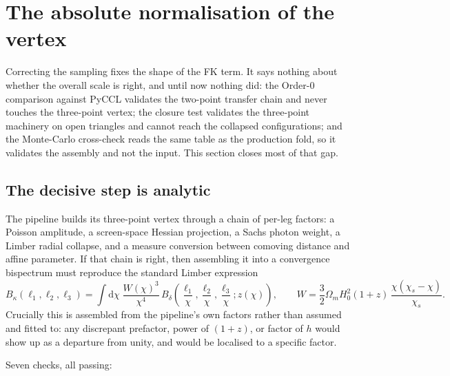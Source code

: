 \section{The absolute normalisation of the vertex}
\label{sec:normalisation}

Correcting the sampling fixes the shape of the FK term. It says nothing
about whether the overall scale is right, and until now nothing did: the
Order-0 comparison against PyCCL validates the two-point transfer chain and
never touches the three-point vertex; the  closure test
validates the three-point machinery on open triangles and cannot reach the
collapsed configurations; and the Monte-Carlo cross-check reads the same
table as the production fold, so it validates the assembly and not the
input. This section closes most of that gap.

\subsection{The decisive step is analytic}

The pipeline builds its three-point vertex through a chain of per-leg
factors: a Poisson amplitude, a screen-space Hessian projection, a Sachs
photon weight, a Limber radial collapse, and a measure conversion between
comoving distance and affine parameter. If that chain is right, then
assembling it into a convergence bispectrum must reproduce the standard
Limber expression
\[
  B_\kappa(\ell_1,\ell_2,\ell_3) = \int\!\mathrm{d}\chi\;
    \frac{W(\chi)^3}{\chi^4}\,
    B_\delta\!\left(\frac{\ell_1}{\chi},\frac{\ell_2}{\chi},
                    \frac{\ell_3}{\chi};z(\chi)\right),
  \qquad
  W = \frac{3}{2}\Omega_m H_0^2 (1+z)\,\frac{\chi(\chi_s-\chi)}{\chi_s}.
\]
Crucially this is assembled from the pipeline's own factors rather than
assumed and fitted to: any discrepant prefactor, power of $(1+z)$, or
factor of $h$ would show up as a departure from unity, and would be
localised to a specific factor.

Seven checks, all passing:

